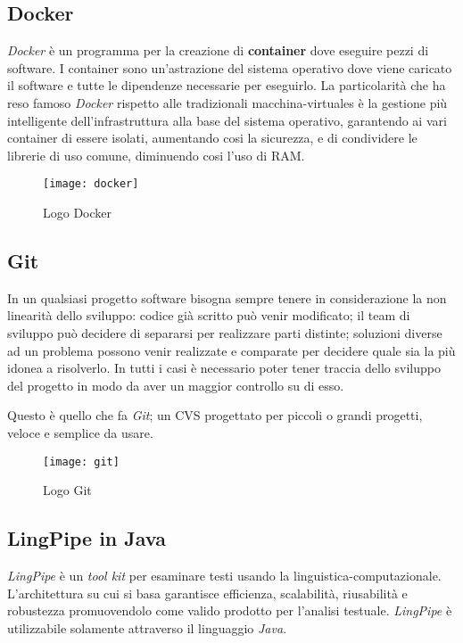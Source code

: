 \subsection{Docker}
\textit{Docker} è un programma per la creazione di \textbf{container}
dove eseguire pezzi di software. I container sono un'astrazione del sistema
operativo dove viene caricato il software e tutte le dipendenze necessarie per
eseguirlo. La particolarità che ha reso famoso \textit{Docker} rispetto alle
tradizionali \glspl{macchina-virtuale} è la gestione più intelligente
dell'infrastruttura alla base del sistema operativo, garantendo ai vari
container di essere isolati, aumentando cosi la sicurezza, e di condividere le
librerie di uso comune, diminuendo cosi l'uso di \acrshort{RAM}.
\begin{figure}[H]
\begin{center}
\texttt{[image: docker]}
\caption{Logo Docker}
\label{fig:docker_logo}
\end{center}
\end{figure}

\subsection{Git}
In un qualsiasi progetto software bisogna sempre tenere in considerazione la non
linearità dello sviluppo: codice già scritto può venir modificato; il team di
sviluppo può decidere di separarsi per realizzare parti distinte; soluzioni
diverse ad un problema possono venir realizzate e comparate per decidere quale
sia la più idonea a risolverlo. In tutti i casi è necessario poter tener traccia
dello sviluppo del progetto in modo da aver un maggior controllo su di esso.

Questo è quello che fa \textit{Git}; un \gls{CVS} progettato per piccoli o
grandi progetti, veloce e semplice da usare.

\begin{figure}[H]
\begin{center}
\texttt{[image: git]}
\caption{Logo Git}
\label{fig:git_logo}
\end{center}
\end{figure}

\subsection{LingPipe in Java}
\textit{LingPipe} è un \textit{tool kit} per esaminare testi usando la
\gls{linguistica-computazionale}. L'architettura su cui si basa garantisce
efficienza, scalabilità, riusabilità e robustezza promuovendolo come valido
prodotto per l'analisi testuale. \textit{LingPipe} è utilizzabile solamente
attraverso il linguaggio \textit{Java}.


